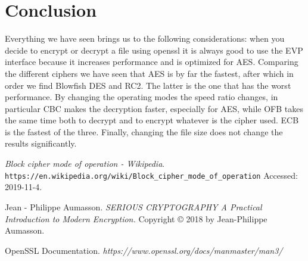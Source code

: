 \documentclass[11pt]{article}
\begin{document}
\newpage
\section{Conclusion}
Everything we have seen brings us to the following considerations: when you decide to encrypt or decrypt a file using openssl it is always 
good to use the EVP interface because it increases performance and is optimized for AES.
Comparing the different ciphers we have seen that AES is by far the fastest, after which in order we find Blowfish DES and RC2. 
The latter is the one that has the worst performance. By changing the operating modes the speed ratio changes, in particular CBC makes 
the decryption faster, especially for AES, while OFB takes the same time both to decrypt and to encrypt whatever is the cipher used.
ECB is the fastest of the three.
Finally, changing the file size does not change the results significantly.

\begin{thebibliography}{99}

{\em Block cipher mode of operation - Wikipedia}.
  \verb|https://en.wikipedia.org/wiki/Block_cipher_mode_of_operation|
  \newblock Accessed: 2019-11-4.

Jean - Philippe Aumasson.
  {\em SERIOUS CRYPTOGRAPHY A Practical Introduction to Modern Encryption.}
  Copyright © 2018 by Jean-Philippe Aumasson.

OpenSSL Documentation. 
{\em https://www.openssl.org/docs/manmaster/man3/}

\end{thebibliography}
\end{document}
